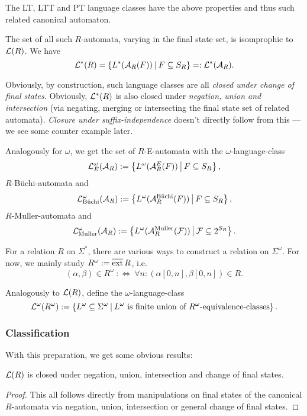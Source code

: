 The LT, LTT and PT language classes have the above properties and thus such related canonical automaton.

The set of all such $R$-automata, varying in the final state set, is isomprophic to $\mathcal{L}(R)$. We have
\[ \Lang^*(R) = \Set{L^*(\A_R(F))}{F \subseteq S_R} =: \Lang^*(\A_R) . \]

Obviously, by construction, such language classes are all \emph{closed under change of final states}. Obviously, $\mathcal{L}^*(R)$ is also closed under \emph{negation, union and intersection} (via negating, merging or intersecting the final state set of related automata). \emph{Closure under suffix-independence} doesn't directly follow from this --- we see some counter example later.

\begin{mydef}
Analogously for $\omega$, we get the set of $R$-E-automata with the $\omega$-language-class
\[ \Lang^\omega_E(\A_R) := \Set{L^\omega(\A^E_R(F))}{F \subseteq S_R} , \]
$R$-Büchi-automata and
\[ \Lang^\omega_{\text{Büchi}} (\A_R) := \Set{L^\omega(\A_R^{\text{Büchi}}(F))}{F \subseteq S_R} , \]
$R$-Muller-automata and
\[ \Lang^\omega_{\text{Muller}} (\A_R) := \Set{L^\omega(\A_R^{\text{Muller}}(\F))}{\F \subseteq 2^{S_R}} . \]
\end{mydef}

\begin{mydef}
For a relation $R$ on $\Sigma^*$, there are various ways to construct a relation on $\Sigma^\omega$. For now, we mainly study $R^\omega := \operatorname{\overline{ext}} R$, i.e.
\[ (\alpha,\beta) \in R^\omega \ :\Leftrightarrow \ \forall n \colon (\alpha[0,n],\beta[0,n]) \in R . \]

Analogously to $\mathcal{L}(R)$, define the $\omega$-language-class
\[ \Lang^\omega(R^\omega) := \Set{L^\omega \subseteq \Sigma^\omega}{\text{$L^\omega$ is finite union of $R^\omega$-equivalence-classes}} . \]
\end{mydef}

\subsubsection{Classification}

With this preparation, we get some obvious results:
\begin{lemma}
$\mathcal{L}(R)$ is closed under negation, union, intersection and change of final states.
\begin{proof}
This all follows directly from manipulations on final states of the canonical $R$-automata via negation, union, intersection or general change of final states.
\end{proof}
\end{lemma}

